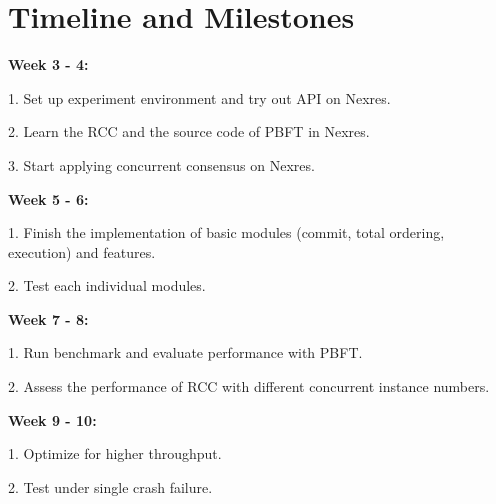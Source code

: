 \section{Timeline and Milestones}
\textbf{Week 3 - 4:}
\par 1. Set up experiment environment and try out API on Nexres.
\par 2. Learn the RCC and the source code of PBFT in Nexres.
\par 3. Start applying concurrent consensus on Nexres. 

\noindent
\textbf{Week 5 - 6:}
\par 1. Finish the implementation of basic modules (commit, total ordering, execution) and features.
\par 2. Test each individual modules.

\noindent
\textbf{Week 7 - 8:}
\par 1. Run benchmark and evaluate performance with PBFT.
\par 2. Assess the performance of RCC with different concurrent instance numbers.

\noindent
\textbf{Week 9 - 10:}
\par 1. Optimize for higher throughput.
\par 2. Test under single crash failure.
